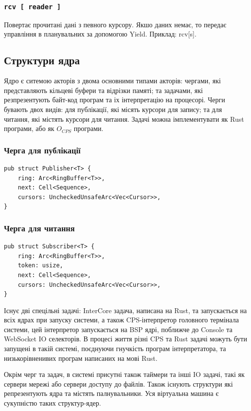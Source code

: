 \begin{definition}
\begin{definition}
\begin{definition}
\begin{definition}
\subsubsection*{\lstinline{rcv [ reader ]}}
Повертає прочитані дані з певного курсору.
Якшо даних немає, то передає управління в планувальних за допомогою Yield.
Приклад: rcv[s].

\newpage
\subsection{Структури ядра}
Ядро є ситемою акторів з двома основними типами акторів:
чергами, які представляють кільцеві буфери та відрізки памяті;
та задачами, які резпрезентують байт-код програм та іх інтерпретацію на процесорі.
Черги бувають двох видів: для публікації, які місять курсори для запису;
та для читання, які містять курсори для читання. Задачі можна імплементувати
як Rust програми, або як $O_{CPS}$ програми.

\subsubsection{Черга для публікації}
\begin{lstlisting}
pub struct Publisher<T> {
    ring: Arc<RingBuffer<T>>,
    next: Cell<Sequence>,
    cursors: UncheckedUnsafeArc<Vec<Cursor>>,
}
\end{lstlisting}

\subsubsection{Черга для читання}
\begin{lstlisting}
pub struct Subscriber<T> {
    ring: Arc<RingBuffer<T>>,
    token: usize,
    next: Cell<Sequence>,
    cursors: UncheckedUnsafeArc<Vec<Cursor>>,
}
\end{lstlisting}

Існує дві спецільні задачі: InterCore задача, написана на Rust,
та запускається на всіх ядрах при запуску системи, а також CPS-інтерпретор
головного термінала системи, цей інтерпретор запускається на BSP ядрі,
поближче до Console та WebSocket IO селекторів.
В процесі життя різні CPS та Rust задачі можуть бути запущені в такій системі,
поєднуючи гнучкість програм інтерпретатора, та низькорівненивих програм написаних на мові Rust.

Окрім черг та задач, в системі присутні також таймери та інші IO задачі,
такі як сервери мережі або сервери доступу до файлів. Також існують
структури які репрезентують ядра та містять палнувальники.
Уся віртуальна машина є сукупністю таких структур-ядер.


\end{definition}
\end{definition}
\end{definition}
\end{definition}
